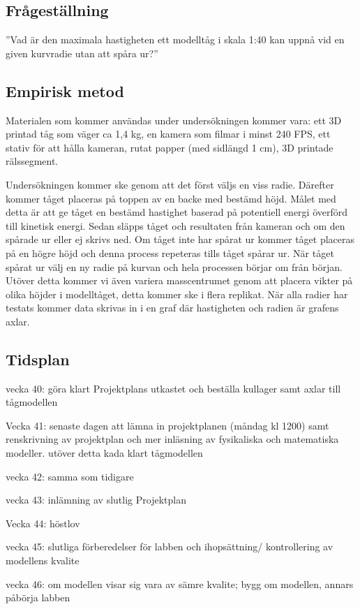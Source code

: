\subsection{Frågeställning}
''Vad är den maximala hastigheten ett modelltåg i skala 1:40 kan uppnå vid en given kurvradie utan att spåra ur?''

\subsection{Empirisk metod}
Materialen som kommer användas under undersökningen kommer vara: ett 3D printad tåg som väger ca 1,4 kg, en kamera som filmar i minst 240 FPS, ett stativ för att hålla kameran, rutat papper (med sidlängd 1 cm), 3D printade rälssegment.

Undersökningen kommer ske genom att det först väljs en viss radie. Därefter kommer tåget placeras på toppen av en backe med bestämd höjd. Målet med detta är att ge tåget en bestämd hastighet baserad på potentiell energi överförd till kinetisk energi. Sedan släpps tåget och resultaten från kameran och om den spårade ur eller ej skrivs ned. Om tåget inte har spårat ur kommer tåget placeras på en högre höjd och denna process repeteras tills tåget spårar ur. När tåget spårat ur välj en ny radie på kurvan och hela processen börjar om från början. Utöver detta kommer vi även variera masscentrumet genom att placera vikter på olika höjder i modelltåget, detta kommer ske i flera replikat. När alla radier har testats kommer data skrivas in i en graf där hastigheten och radien är grafens axlar.



\subsection{Tidsplan}
vecka 40:
göra klart Projektplans utkastet och beställa kullager samt axlar till tågmodellen

Vecka 41: senaste dagen att lämna in projektplanen (måndag kl 1200) samt renskrivning av projektplan och mer inläsning av fysikaliska och matematiska modeller. utöver detta kada klart tågmodellen

vecka 42: samma som tidigare

vecka 43: inlämning av slutlig Projektplan

Vecka 44: höstlov

vecka 45: slutliga förberedelser för labben och ihopsättning/ kontrollering av modellens kvalite

vecka 46: om modellen visar sig vara av sämre kvalite; bygg om modellen, annars påbörja labben

